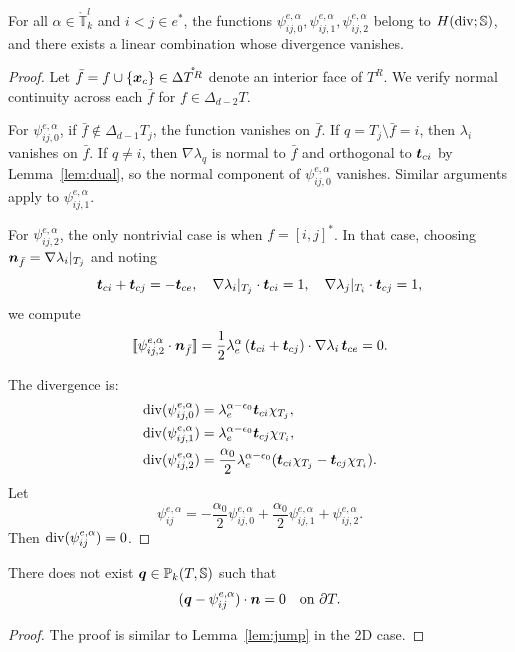 \documentclass[letterpaper,12pt]{article}
\begin{document}
\begin{lemma}
\label{lem:diver2}
For all $\alpha \in \mathring{\mathbb{T}}_k^l$ and $i<j \in e^*$, the functions $\psi_{ij,0}^{e,\alpha}, \psi_{ij,1}^{e,\alpha}, \psi_{ij,2}^{e,\alpha}$ belong to $H(\mathop{\mathrm{div}}; \mathbb{S})$, and there exists a linear combination whose divergence vanishes.
\end{lemma}

\begin{proof}
Let $\bar{f} = f \cup \{\boldsymbol{x}_c\} \in \Delta \mathring{T^R}$ denote an interior face of $T^R$. We verify normal continuity across each $\bar{f}$ for $f \in \Delta_{d-2}T$.

For $\psi_{ij,0}^{e,\alpha}$, if $\bar{f} \notin \Delta_{d-1} T_j$, the function vanishes on $\bar{f}$. If $q = T_j \setminus \bar{f} = i$, then $\lambda_i$ vanishes on $\bar{f}$. If $q \ne i$, then $\nabla \lambda_q$ is normal to $\bar{f}$ and orthogonal to $\boldsymbol{t}_{ci}$ by Lemma~\ref{lem:dual}, so the normal component of $\psi_{ij,0}^{e,\alpha}$ vanishes. Similar arguments apply to $\psi_{ij,1}^{e,\alpha}$.

For $\psi_{ij,2}^{e,\alpha}$, the only nontrivial case is when $f = [i,j]^*$. In that case, choosing $\boldsymbol{n}_{\bar{f}} = \nabla \lambda_i|_{T_j}$ and noting
\[
\boldsymbol{t}_{ci} + \boldsymbol{t}_{cj} = -\boldsymbol{t}_{ce}, \quad 
\nabla \lambda_i|_{T_j} \cdot \boldsymbol{t}_{ci} = 1, \quad 
\nabla \lambda_j|_{T_i} \cdot \boldsymbol{t}_{cj} = 1,
\]
we compute
\[
[\![\psi_{ij,2}^{e,\alpha} \cdot \boldsymbol{n}_{\bar{f}}]\!] = \frac{1}{2} \lambda_e^\alpha\, (\boldsymbol{t}_{ci} + \boldsymbol{t}_{cj}) \cdot \nabla \lambda_i \, \boldsymbol{t}_{ce} = 0.
\]

The divergence is:
\begin{align*}
\mathop{\mathrm{div}}(\psi_{ij,0}^{e,\alpha}) &= \lambda_e^{\alpha - \epsilon_0} \boldsymbol{t}_{ci} \chi_{T_j},\\
\mathop{\mathrm{div}}(\psi_{ij,1}^{e,\alpha}) &= \lambda_e^{\alpha - \epsilon_0} \boldsymbol{t}_{cj} \chi_{T_i},\\
\mathop{\mathrm{div}}(\psi_{ij,2}^{e,\alpha}) &= \frac{\alpha_0}{2} \lambda_e^{\alpha - \epsilon_0} (\boldsymbol{t}_{ci} \chi_{T_j} - \boldsymbol{t}_{cj} \chi_{T_i}).
\end{align*}
Let
\[
\psi_{ij}^{e,\alpha} = -\frac{\alpha_0}{2} \psi_{ij,0}^{e,\alpha} + \frac{\alpha_0}{2} \psi_{ij,1}^{e,\alpha} + \psi_{ij,2}^{e,\alpha}.
\]
Then $\mathop{\mathrm{div}}(\psi_{ij}^{e,\alpha}) = 0$.
\end{proof}

\begin{lemma}
\label{lem:jump}
There does not exist $\boldsymbol{q} \in \mathbb{P}_k(T, \mathbb{S})$ such that 
\[
(\boldsymbol{q} - \psi_{ij}^{e,\alpha})\cdot \boldsymbol{n} = 0 \quad \text{on } \partial T.
\]
\end{lemma}
\begin{proof}
The proof is similar to Lemma~\ref{lem:jump} in the 2D case.
\end{proof}
\end{document}
